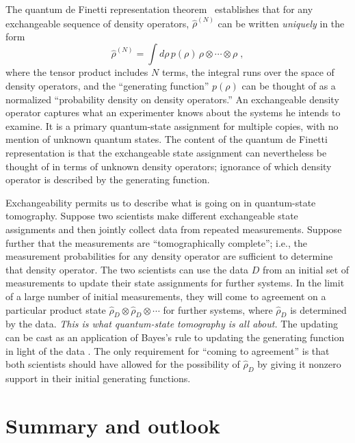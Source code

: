 The quantum de Finetti representation theorem~\cite{Hudson76,Caves01}
establishes that for any exchangeable sequence of density operators,
$\hat\rho^{(N)}$ can be written {\it uniquely\/} in the form
\begin{equation}
\hat\rho^{(N)}=\int d\rho\,p(\rho)\,\rho\otimes\cdots\otimes\rho\;,
\end{equation}
where the tensor product includes $N$ terms, the integral runs over
the space of density operators, and the ``generating function''
$p(\rho)$ can be thought of as a normalized ``probability density on
density operators.''  An exchangeable density operator captures what
an experimenter knows about the systems he intends to examine.  It is
a primary quantum-state assignment for multiple copies, with no
mention of unknown quantum states.  The content of the quantum de
Finetti representation is that the exchangeable state assignment can
nevertheless be thought of in terms of unknown density operators;
ignorance of which density operator is described by the generating
function.

Exchangeability permits us to describe what is going on in
quantum-state tomography.  Suppose two scientists make different
exchangeable state assignments and then jointly collect data from
repeated measurements.  Suppose further that the measurements are
``tomographically complete''; i.e., the measurement probabilities for
any density operator are sufficient to determine that density
operator.  The two scientists can use the data $D$ from an initial
set of measurements to update their state assignments for further
systems.  In the limit of a large number of initial measurements,
they will come to agreement on a particular product state
$\hat\rho_{\scriptscriptstyle D}\otimes\hat\rho_{\scriptscriptstyle
D}\otimes\cdots$ for further systems, where
$\hat\rho_{\scriptscriptstyle D}$ is determined by the data. {\it
This is what quantum-state tomography is all about.}  The updating
can be cast as an application of Bayes's rule to updating the
generating function in light of the data \cite{Schack01}.  The only
requirement for ``coming to agreement'' is that both scientists
should have allowed for the possibility of
$\hat\rho_{\scriptscriptstyle D}$ by giving it nonzero support in
their initial generating functions.

\section{Summary and outlook}

